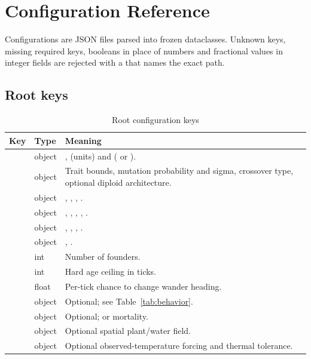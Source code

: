 \chapter{Configuration Reference}

Configurations are JSON files parsed into frozen dataclasses. Unknown keys,
missing required keys, booleans in place of numbers and fractional values in
integer fields are rejected with a  that names the exact path.

\section{Root keys}
\begin{table}[htbp]
\centering
\caption{Root configuration keys}
\begin{tabularx}{\textwidth}{llL}
\toprule
Key & Type & Meaning \\
\midrule
{} & object & ,  (units) and  ( or ). \\
 & object & Trait bounds, mutation probability and sigma, crossover type, optional diploid architecture. \\
 & object & , , , . \\
 & object & , , , , . \\
 & object & , , , . \\
 & object & , . \\
 & int & Number of founders. \\
 & int & Hard age ceiling in ticks. \\
 & float & Per-tick chance to change wander heading. \\
 & object & Optional; see Table~\ref{tab:behavior}. \\
 & object & Optional;  or  mortality. \\
 & object & Optional spatial plant/water field. \\
 & object & Optional observed-temperature forcing and thermal tolerance. \\
\bottomrule
\end{tabularx}
\end{table}

